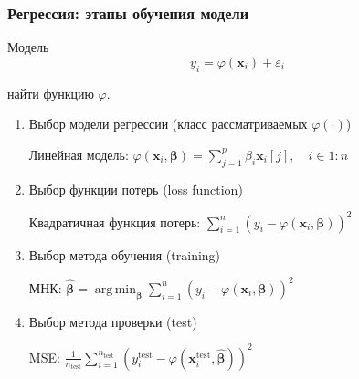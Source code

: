 \documentclass[ucs, notheorems, handout]{beamer}
\DeclareMathOperator*{\argmin}{arg\,min}
\newcommand{\betah}{\hat{\bm \beta}}
\newcommand{\betaa}{\bm{\beta}}
\begin{document}
\begin{frame}
    \frametitle{Регрессия: этапы обучения модели}
\begin{block}{Модель}
$$
y_i = \varphi(\mathbf x_i) + \varepsilon_i
$$
\end{block}
\textbf{\color{blue}{Задача:}} найти функцию $\varphi$.
\vspace{3mm}
\begin{enumerate}
	\item Выбор модели регрессии (класс рассматриваемых $\varphi(\cdot)$)
	
	{\color{gray} Линейная модель: $\varphi(\mathbf x_i, \betaa) = \sum_{j = 1}^p \beta_i \mathbf x_i[j],\quad i \in 1:n $}
	
	\item Выбор функции потерь (loss function)
	
	{\color{gray} Квадратичная функция потерь: $\sum_{i = 1}^n(y_i - \varphi(\mathbf x_i, \betaa))^2$}
	\item Выбор метода обучения (training)

{\color{gray} МНК: $\betah = \argmin_{\betaa}{\sum_{i = 1}^n(y_i - \varphi(\mathbf x_i, \betaa))^2}$}
	\item Выбор метода проверки (test)

{\color{gray} MSE: $\tfrac{1}{n_{\text{test}}}\sum_{i = 1}^{n_{\text{test}}}(y^{\text{test}}_i - \varphi(\mathbf x_i^{\text{test}}, \betah))^2$}
\end{enumerate}            
\end{frame}
\end{document}
